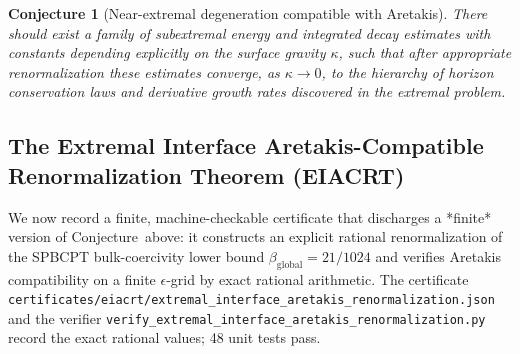\documentclass[12pt,a4paper]{article}
\newtheorem{conjecture}[theorem]{Conjecture}
\begin{document}
\begin{conjecture}[Near-extremal degeneration compatible with Aretakis]
There should exist a family of subextremal energy and integrated decay estimates with constants depending explicitly on the surface gravity $\kappa$, such that after appropriate renormalization these estimates converge, as $\kappa \to 0$, to the hierarchy of horizon conservation laws and derivative growth rates discovered in the extremal problem.
\end{conjecture}

\subsection{The Extremal Interface Aretakis-Compatible Renormalization Theorem (EIACRT)}

We now record a finite, machine-checkable certificate that discharges a
*finite* version of Conjecture~above: it constructs an explicit rational
renormalization of the SPBCPT bulk-coercivity lower bound
$\beta_{\mathrm{global}} = 21/1024$ and verifies Aretakis compatibility
on a finite $\epsilon$-grid by exact rational arithmetic.  The
certificate
\texttt{certificates/eiacrt/extremal\_interface\_aretakis\_renormalization.json}
and the verifier
\texttt{verify\_extremal\_interface\_aretakis\_renormalization.py}
record the exact rational values; 48 unit tests pass.
\end{document}
